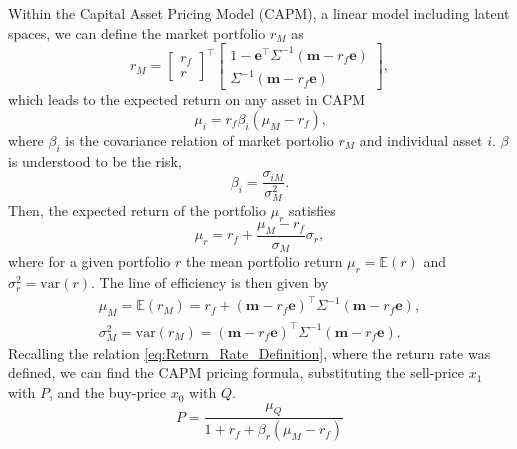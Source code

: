 Within the Capital Asset Pricing Model (CAPM), a linear model including latent spaces, we can define the market portfolio $r_M$ as
\begin{equation}%
	r_M = \begin{bmatrix} r_f \\ r \end{bmatrix}^{\top} \begin{bmatrix} 1-\bm{e}^{\top} \Sigma^{-1}(\bm{m}-r_f\bm{e}) \\ \Sigma^{-1}(\bm{m}-r_f\bm{e}) \end{bmatrix},
\label{eq: market portfolio capm}
\end{equation}
which leads to the expected return on any asset in CAPM
\begin{equation}%
	\mu_i = r_f \beta_i(\mu_M -r_f) \text{,}
\label{eq: expected return any asset capm}
\end{equation}
where $\beta_i$ is the covariance relation of market portolio $r_M$ and individual asset $i$. $\beta$ is understood to be the risk, 
\begin{equation}%
	\beta_i = \frac{\sigma_{iM}}{\sigma_M^2}.
\label{eq: beta capm}
\end{equation}
Then, the expected return of the portfolio $\mu_r$ satisfies 
\begin{equation}%
	\mu_r = r_f + \frac{\mu_M - r_f}{\sigma_M}\sigma_r,
\label{eq: expected return of portfolio capm}
\end{equation}
where for a given portfolio $r$ the mean portfolio return $\mu_r = \mathbb{E}(r)$ and $\sigma_r^2 = \text{var}(r)$. The line of efficiency is then given by 
\begin{subequations}%
	\label{eq:efficiency line capm}
	\begin{align}
	\mu_M = \mathbb{E}(r_M) = r_f + (\bm{m}-r_f\bm{e})^{\top}\Sigma^{-1}(\bm{m}-r_f\bm{e}),         \label{eq:Expected value market} \\
	\sigma_M^2 = \text{var}(r_M) = (\bm{m}-r_f\bm{e})^{\top}\Sigma^{-1}(\bm{m}-r_f\bm{e}).         \label{eq:variance market}
	\end{align}
\end{subequations}
Recalling the relation \ref{eq:Return_Rate_Definition}, where the return rate was defined, we can find the CAPM pricing formula, substituting the sell-price $x_1$ with $P$, and the buy-price $x_0$ with $Q$. 
\begin{equation}%
	P = \frac{\mu_Q}{1+r_f+\beta_r(\mu_M-r_f)}
\label{eq: capm pricing formula}
\end{equation}
